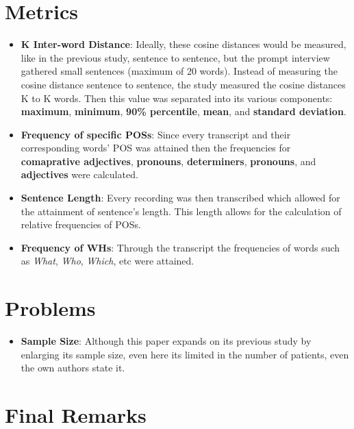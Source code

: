 \documentclass{Paper_Summary}
\begin{document}
\section{Metrics}
    \begin{itemize}
        \item \textbf{K Inter-word Distance}: Ideally, these cosine distances would be measured, like in the previous study, sentence to sentence, but the prompt interview gathered small sentences (maximum of 20 words). Instead of measuring the cosine distance sentence to sentence, the study measured the cosine distances K to K words. Then this value was separated into its various components: \textbf{maximum}, \textbf{minimum}, \textbf{90\% percentile}, \textbf{mean}, and \textbf{standard deviation}.
        \item \textbf{Frequency of specific POSs}: Since every transcript and their corresponding words' POS was attained then the frequencies for \textbf{comaprative adjectives}, \textbf{pronouns}, \textbf{determiners}, \textbf{pronouns}, and \textbf{adjectives} were calculated.
        \item \textbf{Sentence Length}: Every recording was then transcribed which allowed for the attainment of sentence's length. This length allows for the calculation of relative frequencies of POSs.
        \item \textbf{Frequency of WHs}: Through the transcript the frequencies of words such as \emph{What}, \emph{Who}, \emph{Which}, etc were attained.
    \end{itemize}

\section{Problems}
    \begin{itemize}
        \item \textbf{Sample Size}: Although this paper expands on its previous study by enlarging its sample size, even here its limited in the number of patients, even the own authors state it.
    \end{itemize}


\section{Final Remarks}
    
\end{document}
